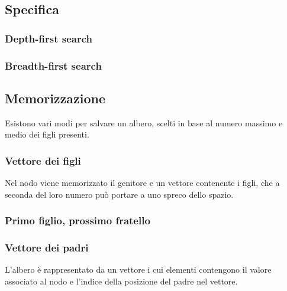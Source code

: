 \subsection{Specifica}

\subsubsection{Depth-first search}

\subsubsection{Breadth-first search}

\subsection{Memorizzazione}
Esistono vari modi per salvare un albero, scelti in base al numero massimo e medio dei figli presenti.
\subsubsection{Vettore dei figli}
Nel nodo viene memorizzato il genitore e un vettore contenente i figli, che a seconda del loro numero pu\`o portare a uno spreco dello spazio.
\newpage
\subsubsection{Primo figlio, prossimo fratello}

\subsubsection{Vettore dei padri}
L'albero \`e rappresentato da un vettore i cui elementi contengono il valore associato al nodo e l'indice della posizione del padre nel vettore.
